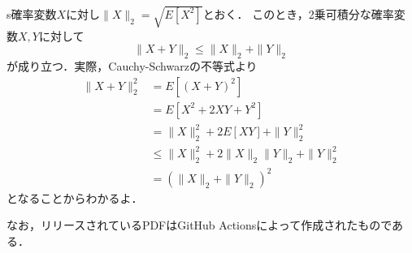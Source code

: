 \documentclass{jsarticle}
\begin{document}
s確率変数$X$に対し$\|X\|_2=\sqrt{E[X^2]}$とおく．
このとき，2乗可積分な確率変数$X,Y$に対して
\[ \|X+Y\|_2\leq\|X\|_2+\|Y\|_2 \]
が成り立つ．実際，Cauchy-Schwarzの不等式より
\begin{align*}
\|X+Y\|_2^2
&=E[(X+Y)^2] \\
&=E[X^2+2XY+Y^2] \\
&=\|X\|_2^2+2E[XY]+\|Y\|_2^2 \\
&\leq\|X\|_2^2+2\|X\|_2\|Y\|_2+\|Y\|_2^2 \\
&=(\|X\|_2+\|Y\|_2)^2
\end{align*}
となることからわかるよ．

なお，リリースされているPDFはGitHub Actionsによって作成されたものである．
\end{document}
